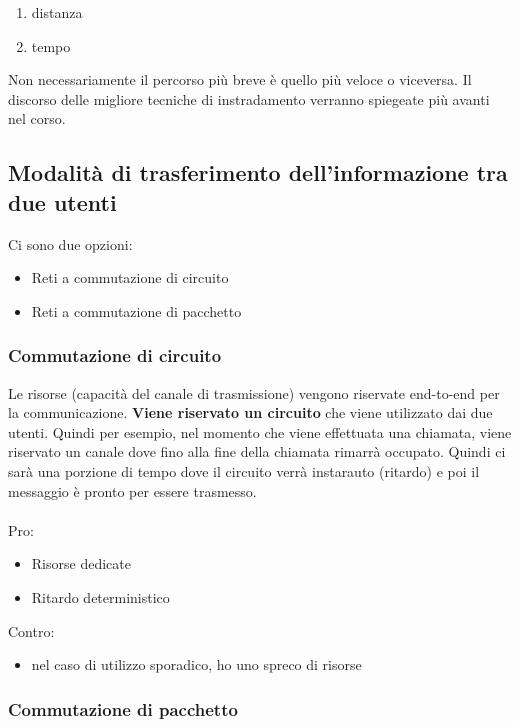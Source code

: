 \documentclass[a4paper]{article}
\begin{document}
\begin{enumerate}
    \item distanza
    \item tempo
\end{enumerate}
Non necessariamente il percorso più breve è quello più veloce o viceversa. Il discorso delle migliore tecniche di instradamento verranno spiegeate più avanti nel corso.

\subsection{Modalità di trasferimento dell'informazione tra due utenti}

Ci sono due opzioni: 
\begin{itemize}
    \item Reti a commutazione di circuito
    \item Reti a commutazione di pacchetto
\end{itemize}

\subsubsection{Commutazione di circuito}

Le risorse (capacità del canale di trasmissione) vengono riservate end-to-end per la communicazione. \textbf{Viene riservato un circuito }che viene utilizzato dai due utenti. Quindi per esempio, nel momento che viene effettuata una chiamata, viene riservato un canale dove fino alla fine della chiamata rimarrà occupato. Quindi ci sarà una porzione di tempo dove il circuito verrà instarauto (ritardo) e poi il messaggio è pronto per essere trasmesso.
\\\\Pro: 
\begin{itemize}
    \item Risorse dedicate
    \item Ritardo deterministico
\end{itemize}
Contro:
\begin{itemize}
    \item nel caso di utilizzo sporadico, ho uno spreco di risorse
\end{itemize}
\subsubsection{Commutazione di pacchetto}
\end{document}

